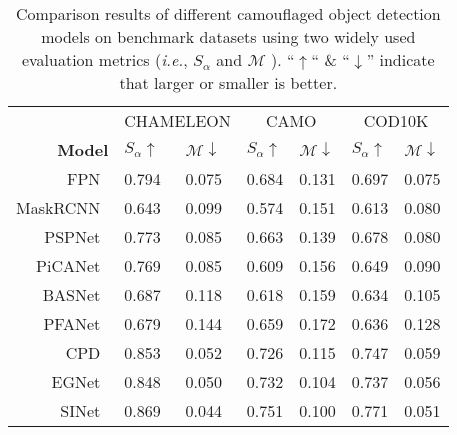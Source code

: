 \documentclass[10pt,twocolumn,letterpaper]{article}
\def\ie{\emph{i.e.}}
\begin{document}
\begin{table}[t!]
  \centering
  \renewcommand{\arraystretch}{1.25}
  \caption{Comparison results of different camouflaged object detection models on benchmark datasets using two widely used evaluation metrics (\ie, $S_{\alpha}$ \cite{fan2017structure} and $\mathcal{M}$ \cite{perazzi2012saliency}).
  ``$\uparrow$`` \& ``$\downarrow$'' indicate that larger or smaller is better. 
  }\scriptsize
  \begin{tabular}{r|p{0.4cm}p{0.4cm}|p{0.5cm}p{0.5cm}|p{0.5cm}p{0.5cm}}
  \hline\toprule

    &\multicolumn{2}{c|}{CHAMELEON}
    &\multicolumn{2}{c|}{CAMO}
    &\multicolumn{2}{c}{COD10K}\\

    \textbf{Model}
    &$S_{\alpha}\uparrow$ &$\mathcal{M}\downarrow$
    &$S_{\alpha}\uparrow$ &$\mathcal{M}\downarrow$
    &$S_{\alpha}\uparrow$ &$\mathcal{M}\downarrow$ \\

    \midrule
    FPN~\cite{fpn}

    & 0.794  & 0.075
    & 0.684  & 0.131
    & 0.697  & 0.075 \\

    MaskRCNN~\cite{maskrcnn}
    & 0.643  & 0.099
    & 0.574  & 0.151
    & 0.613  & 0.080 \\

    PSPNet~\cite{pspnet}
    & 0.773 & 0.085
    & 0.663 & 0.139
    & 0.678 & 0.080 \\

    PiCANet~\cite{picanet}
    & 0.769 & 0.085
    & 0.609 & 0.156
    & 0.649 & 0.090 \\

    BASNet~\cite{basnet}
    & 0.687 & 0.118
    & 0.618 & 0.159
    & 0.634 & 0.105 \\

    PFANet~\cite{pfanet}
    & 0.679 & 0.144
    & 0.659 & 0.172
    & 0.636 & 0.128 \\

    CPD~\cite{cpd}
    & 0.853 & 0.052
    & 0.726 & 0.115
    & 0.747 & 0.059 \\

    EGNet~\cite{egnet}
    & 0.848 & 0.050
    & 0.732 & 0.104
    & 0.737 & 0.056 \\

    SINet~\cite{fan2021concealed}
    & 0.869 & 0.044
    & 0.751 & 0.100
    & 0.771 & 0.051 \\


\end{tabular}
\end{table}
\end{document}
